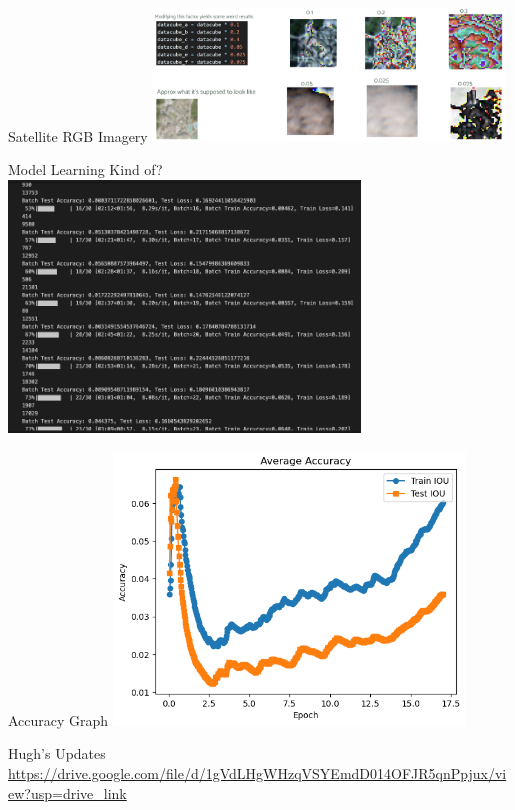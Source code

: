\begin{frame}{Satellite RGB Imagery}
    \centering
    \includegraphics[height=0.7\textheight,width=0.7\textwidth,keepaspectratio]{images/mm-rgbsat.png}
\end{frame}

\begin{frame}{Model Learning Kind of?}
    \centering
    \includegraphics[height=0.7\textheight,width=0.7\textwidth,keepaspectratio]{images/train.png}
\end{frame}

\begin{frame}{Accuracy Graph}
    \centering
    \includegraphics[height=0.7\textheight,width=0.7\textwidth,keepaspectratio]{images/Average Accuracy.png}
\end{frame}

\begin{frame}{Hugh's Updates}
    \url{https://drive.google.com/file/d/1gVdLHgWHzqVSYEmdD014OFJR5qnPpjux/view?usp=drive_link}
\end{frame}
